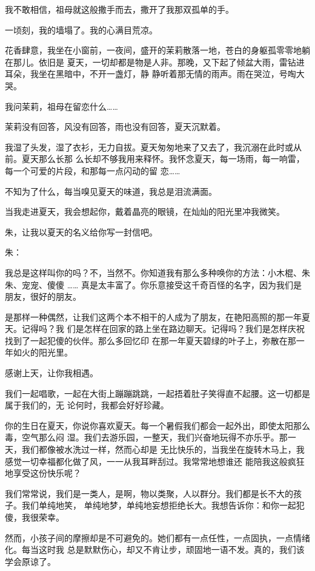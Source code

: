 		我不敢相信，祖母就这般撒手而去，撒开了我那双孤单的手。

		一顷刻，我的墙塌了。我的心满目荒凉。

		花香肆意，我坐在小窗前，一夜间，盛开的茉莉散落一地，苍白的身躯孤零零地躺在那儿。依旧是
	夏天，一切却都是物是人非。那晚，又下起了倾盆大雨，雷钻进耳朵，我坐在黑暗中，不开一盏灯，静
	静听着那无情的雨声。雨在哭泣，号啕大哭。

		我问茉莉，祖母在留恋什么……

		茉莉没有回答，风没有回答，雨也没有回答，夏天沉默着。

		我湿了头发，湿了衣衫，无力自拔。夏天匆匆地来了又去了，我沉溺在此时或从前。夏天那么长那
	么长却不够我用来释怀。我怀念夏天，每一场雨，每一响雷，每一个可爱的片段，和那每一点闪动的留
	恋……

		不知为了什么，每当嗅见夏天的味道，我总是泪流满面。

	\endwriting



		当我走进夏天，我会想起你，戴着晶亮的眼镜，在灿灿的阳光里冲我微笑。

		朱，让我以夏天的名义给你写一封信吧。

		朱：

		我总是这样叫你的吗？不，当然不。你知道我有那么多种唤你的方法：小木棍、朱朱、宠宠、傻傻
	…… 真是太丰富了。你乐意接受这千奇百怪的名字，因为我们是朋友，很好的朋友。

		是那样一种偶然，让我们这两个本不相干的人成为了朋友，在艳阳高照的那一年夏天。记得吗？我
	们是怎样在回家的路上坐在路边聊天。记得吗？我们是怎样庆祝找到了一起犯傻的伙伴。那么多回忆印
	在那一年夏天碧绿的叶子上，弥散在那一年如火的阳光里。

		感谢上天，让你我相遇。

		我们一起唱歌，一起在大街上蹦蹦跳跳，一起捂着肚子笑得直不起腰。这一切都是属于我们的，无
	论何时，我都会好好珍藏。

		你的生日在夏天，你说你喜欢夏天。每一个暑假我们都会一起外出，即使太阳那么毒，空气那么闷
	湿。我们去游乐园，一整天，我们兴奋地玩得不亦乐乎。那一天，我们都像被水洗过一样，然而心却是
	无比快乐的，当我坐在旋转木马上，我感觉一切幸福都化做了风，一一从我耳畔刮过。我常常地想谁还
	能陪我这般疯狂地享受这份快乐呢？

		我们常常说，我们是一类人，是啊，物以类聚，人以群分。我们都是长不大的孩子。我们单纯地笑，
	单纯地梦，单纯地妄想拒绝长大。我想告诉你：和你一起犯傻，我很荣幸。

		然而，小孩子间的摩擦却是不可避免的。她们都有一点任性，一点固执，一点情绪化。每当这时我
	总是默默伤心，却又不肯让步，顽固地一语不发。真的，我们该学会原谅了。

